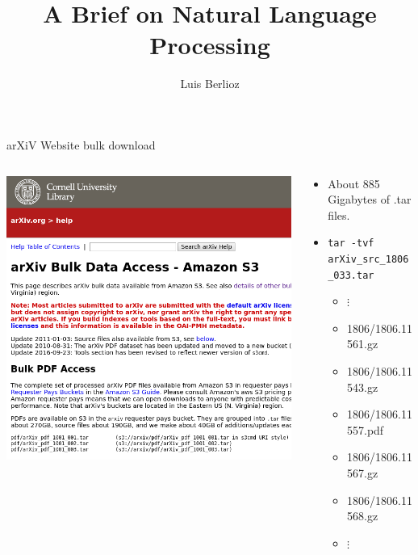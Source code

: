 \documentclass[9pt]{beamer}
\title{A Brief on Natural Language Processing}
\author{Luis Berlioz}
\begin{document}
\maketitle


\begin{frame}{arXiV Website bulk download}
    \begin{columns}[T]
        \begin{column}{0.4\textwidth}
    \includegraphics[width=\textwidth]{bulk_download.png} 
        \end{column}
        \begin{column}{0.6\textwidth}
            \begin{itemize}
                \item About 885 Gigabytes of .tar files.
                \item \texttt{tar -tvf arXiv\_src\_1806\_033.tar}
                    \begin{itemize}
\item \hspace{4em}      $\vdots$
\item 1806/1806.11561.gz
\item 1806/1806.11543.gz
\item 1806/1806.11557.pdf
\item 1806/1806.11567.gz
\item 1806/1806.11568.gz
\item \hspace{4em}      $\vdots$
\end{itemize}

            \end{itemize}
        \end{column}
    \end{columns}
            
\end{frame}
\end{document}
